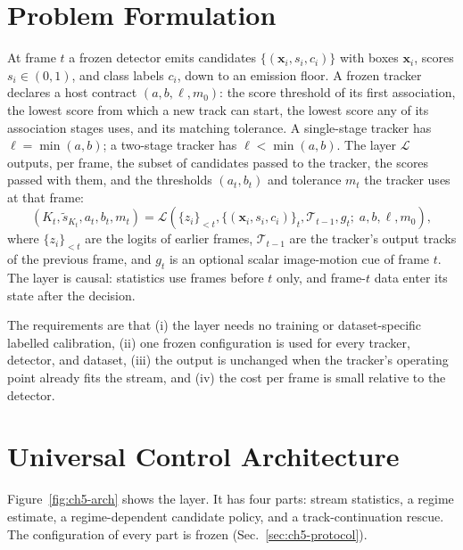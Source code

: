 \section{Problem Formulation}\label{sec:ch5-problem}
At frame $t$ a frozen detector emits candidates $\{(\mathbf{x}_i, s_i, c_i)\}$ with boxes $\mathbf{x}_i$, scores $s_i\in(0,1)$, and class labels $c_i$, down to an emission floor. A frozen tracker declares a host contract $(a, b, \ell, m_0)$: the score threshold of its first association, the lowest score from which a new track can start, the lowest score any of its association stages uses, and its matching tolerance. A single-stage tracker has $\ell=\min(a,b)$; a two-stage tracker has $\ell<\min(a,b)$. The layer $\mathcal{L}$ outputs, per frame, the subset of candidates passed to the tracker, the scores passed with them, and the thresholds $(a_t, b_t)$ and tolerance $m_t$ the tracker uses at that frame:
\begin{equation}
\left(K_t, \tilde s_{K_t}, a_t, b_t, m_t\right) = \mathcal{L}\left(\{z_i\}_{<t}, \{(\mathbf{x}_i, s_i, c_i)\}_t, \mathcal{T}_{t-1}, g_t;\; a,b,\ell,m_0\right),
\label{eq:ch5-layer}
\end{equation}
where $\{z_i\}_{<t}$ are the logits of earlier frames, $\mathcal{T}_{t-1}$ are the tracker's output tracks of the previous frame, and $g_t$ is an optional scalar image-motion cue of frame $t$. The layer is causal: statistics use frames before $t$ only, and frame-$t$ data enter its state after the decision.

The requirements are that (i) the layer needs no training or dataset-specific labelled calibration, (ii) one frozen configuration is used for every tracker, detector, and dataset, (iii) the output is unchanged when the tracker's operating point already fits the stream, and (iv) the cost per frame is small relative to the detector.

\section{Universal Control Architecture}\label{sec:ch5-arch}
Figure~\ref{fig:ch5-arch} shows the layer. It has four parts: stream statistics, a regime estimate, a regime-dependent candidate policy, and a track-continuation rescue. The configuration of every part is frozen (Sec.~\ref{sec:ch5-protocol}).

